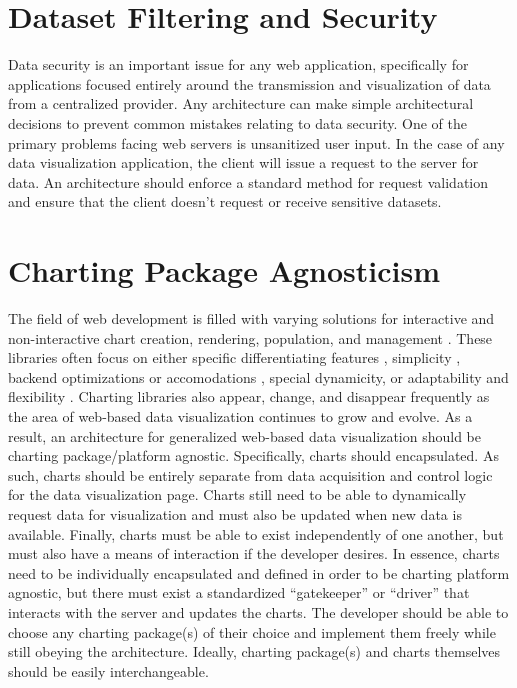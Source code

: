 \section{Dataset Filtering and Security}
Data security is an important issue for any web application, specifically for applications focused entirely around the transmission and visualization of data from a centralized provider. Any architecture can make simple architectural decisions to prevent common mistakes relating to data security.  One of the primary problems facing web servers is unsanitized user input.  In the case of any data visualization application, the client will issue a request to the server for data.  An architecture should enforce a standard method for request validation and ensure that the client doesn’t request or receive sensitive datasets. \par

\section{Charting Package Agnosticism}
The field of web development is filled with varying solutions for interactive and non-interactive chart creation, rendering, population, and management \cite{d3homepage, chartjs, highcharts, c3js, bokehjs}.  These libraries often focus on either specific differentiating features \cite{chartjs, highcharts}, simplicity \cite{chartjs, highcharts}, backend optimizations or accomodations \cite{bokehjs}, special dynamicity, or adaptability and flexibility \cite{d3homepage, c3js}. Charting libraries also appear, change, and disappear frequently as the area of web-based data visualization continues to grow and evolve.  As a result, an architecture for generalized web-based data visualization should be charting package/platform agnostic.  Specifically, charts should encapsulated.  As such, charts should be entirely separate from data acquisition and control logic for the data visualization page.  Charts still need to be able to dynamically request data for visualization and must also be updated when new data is available.  Finally, charts must be able to exist independently of one another, but must also have a means of interaction if the developer desires.  In essence, charts need to be individually encapsulated and defined in order to be charting platform agnostic, but there must exist a standardized “gatekeeper” or “driver” that interacts with the server and updates the charts.  The developer should be able to choose any charting package(s) of their choice and implement them freely while still obeying the architecture.  Ideally, charting package(s) and charts themselves should be easily interchangeable.  \par

